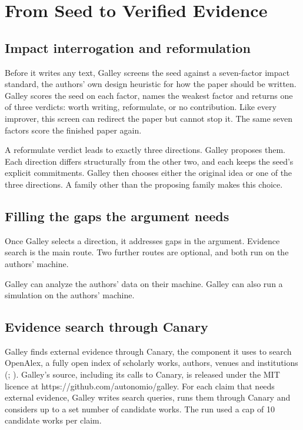 \documentclass[
]{article}
\begin{document}
\section{From Seed to Verified
Evidence}\label{from-seed-to-verified-evidence}

\subsection{Impact interrogation and
reformulation}\label{impact-interrogation-and-reformulation}

Before it writes any text, Galley screens the seed against a
seven-factor impact standard, the authors' own design heuristic for how
the paper should be written. Galley scores the seed on each factor,
names the weakest factor and returns one of three verdicts: worth
writing, reformulate, or no contribution. Like every improver, this
screen can redirect the paper but cannot stop it. The same seven factors
score the finished paper again.

A reformulate verdict leads to exactly three directions. Galley proposes
them. Each direction differs structurally from the other two, and each
keeps the seed's explicit commitments. Galley then chooses either the
original idea or one of the three directions. A family other than the
proposing family makes this choice.

\subsection{Filling the gaps the argument
needs}\label{filling-the-gaps-the-argument-needs}

Once Galley selects a direction, it addresses gaps in the argument.
Evidence search is the main route. Two further routes are optional, and
both run on the authors' machine.

Galley can analyze the authors' data on their machine. Galley can also
run a simulation on the authors' machine.

\subsection{Evidence search through
Canary}\label{evidence-search-through-canary}

Galley finds external evidence through Canary, the component it uses to
search OpenAlex, a fully open index of scholarly works, authors, venues
and institutions (;
). Galley's source,
including its calls to Canary, is released under the MIT licence at
https://github.com/autonomio/galley. For each claim that needs external
evidence, Galley writes search queries, runs them through Canary and
considers up to a set number of candidate works. The run used a cap of
10 candidate works per claim.
\end{document}
